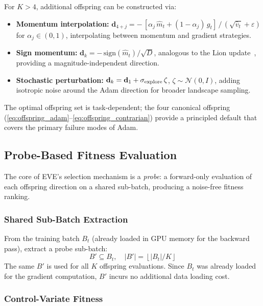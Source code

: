 \documentclass[12pt]{article}
\newcommand{\sign}{\mathrm{sign}}
\begin{document}
For $K > 4$, additional offspring can be constructed via:
\begin{itemize}[leftmargin=1.6em, itemsep=3pt]
  \item \textbf{Momentum interpolation:}
    $\mathbf{d}_{4+j} = -\,[\alpha_j\, \hat{m}_t + (1 - \alpha_j)\, g_t]
    \,/\, (\sqrt{\hat{v}_t} + \varepsilon)$
    for $\alpha_j \in (0, 1)$, interpolating between momentum and
    gradient strategies.
  \item \textbf{Sign momentum:}
    $\mathbf{d}_k = -\,\sign(\hat{m}_t) / \sqrt{D}$, analogous to
    the Lion update~\cite{chen2024lion}, providing a
    magnitude-independent direction.
  \item \textbf{Stochastic perturbation:}
    $\mathbf{d}_k = \mathbf{d}_1 + \sigma_{\rm explore}\,\zeta$,
    $\zeta \sim \mathcal{N}(0, I)$, adding isotropic noise around the
    Adam direction for broader landscape sampling.
\end{itemize}
The optimal offspring set is task-dependent; the four canonical offspring
(\cref{eq:offspring_adam}--\cref{eq:offspring_contrarian}) provide a
principled default that covers the primary failure modes of Adam.


\subsection{Probe-Based Fitness Evaluation}
\label{ssec:probe}

The core of EVE's selection mechanism is a \emph{probe}: a forward-only
evaluation of each offspring direction on a shared sub-batch, producing
a noise-free fitness ranking.

\subsubsection{Shared Sub-Batch Extraction}

From the training batch $B_t$ (already loaded in GPU memory for the
backward pass), extract a probe sub-batch:
\begin{equation}
  B' \subseteq B_t, \quad |B'| = \left\lfloor |B_t| / K \right\rfloor
  \label{eq:probe_subbatch}
\end{equation}
The same $B'$ is used for all $K$ offspring evaluations.
Since $B_t$ was already loaded for the gradient computation, $B'$ incurs
no additional data loading cost.

\subsubsection{Control-Variate Fitness}
\end{document}
